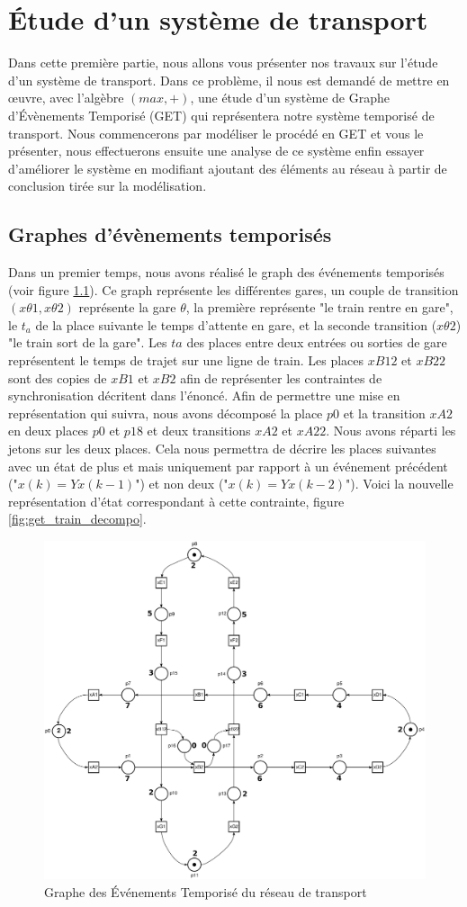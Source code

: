 \chapter{Étude d'un système de transport}
Dans cette première partie, nous allons vous présenter nos travaux sur l'étude d'un système de transport. Dans ce problème, il nous est demandé de mettre en œuvre, avec l'algèbre $(max,+)$, une étude d'un système de Graphe d'Évènements Temporisé (GET) qui représentera notre système temporisé de transport. Nous commencerons par modéliser le procédé en GET et vous le présenter, nous effectuerons ensuite une analyse de ce système enfin essayer d'améliorer le système en modifiant ajoutant des éléments au réseau à partir de conclusion tirée sur la modélisation.

\section{Graphes d'évènements temporisés}
Dans un premier temps, nous avons réalisé le graph des événements temporisés (voir figure \ref{fig:get_train}). Ce graph représente les différentes gares, un couple de transition $(x \theta1,x\theta2)$ représente la gare $\theta$, la première représente "le train rentre en gare", le $t_a$ de la place suivante le temps d'attente en gare, et la seconde transition ($x\theta2$) "le train sort de la gare". Les $ta$ des places entre deux entrées ou sorties de gare représentent le temps de trajet sur une ligne de train. Les places $xB12$ et $xB22$ sont des copies  de $xB1$ et $xB2$ afin de représenter les contraintes de synchronisation décritent dans l'énoncé.
Afin de permettre une mise en représentation qui suivra, nous avons décomposé la place $p0$ et la transition $xA2$ en deux places $p0$ et $p18$ et deux transitions $xA2$ et $xA22$. Nous avons réparti les jetons sur les deux places. Cela nous permettra de décrire les places suivantes avec un état de plus et mais uniquement par rapport à un événement précédent ("$x(k)=Yx(k-1)$") et non deux ("$x(k)=Yx(k-2)$").
Voici la nouvelle représentation d'état correspondant à cette contrainte, figure \ref{fig:get_train_decompo}.
\begin{figure}[!ht]
\centering
\includegraphics[width =.8 \textwidth]{./I/images/train.pdf}
\caption{\label{fig:get_train} Graphe des Événements Temporisé du réseau de transport}
\end{figure}


